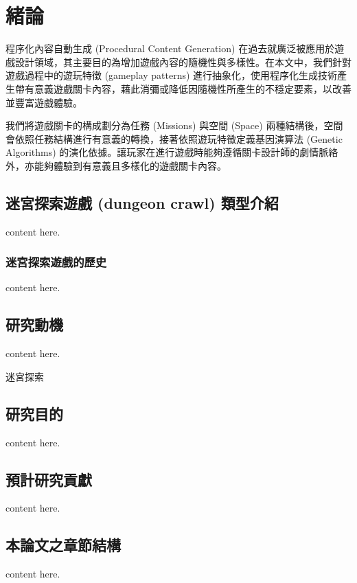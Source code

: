 % 
\chapter{緒論}
\label{cha:intro}

程序化內容自動生成 (Procedural Content Generation) 在過去就廣泛被應用於遊戲設計領域，其主要目的為增加遊戲內容的隨機性與多樣性。在本文中，我們針對遊戲過程中的遊玩特徵 (gameplay patterns) 進行抽象化，使用程序化生成技術產生帶有意義遊戲關卡內容，藉此消彌或降低因隨機性所產生的不穩定要素，以改善並豐富遊戲體驗。

我們將遊戲關卡的構成劃分為任務 (Missions) 與空間 (Space) 兩種結構後，空間會依照任務結構進行有意義的轉換，接著依照遊玩特徵定義基因演算法 (Genetic Algorithms) 的演化依據。讓玩家在進行遊戲時能夠遵循關卡設計師的劇情脈絡外，亦能夠體驗到有意義且多樣化的遊戲關卡內容。

\section{迷宮探索遊戲 (dungeon crawl) 類型介紹}

content here.

\subsection{迷宮探索遊戲的歷史}

content here.

\section{研究動機}

content here.

迷宮探索

\section{研究目的}

content here.

\section{預計研究貢獻}

content here.

\section{本論文之章節結構}

content here.


